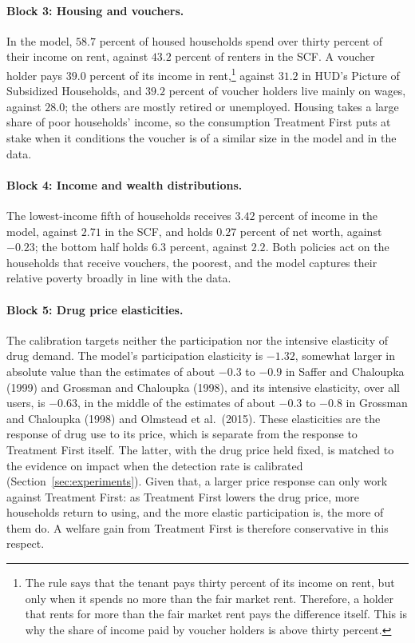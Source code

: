\documentclass[10pt]{article}
\begin{document}
\paragraph{Block 3: Housing and vouchers.} In the model, $58.7$ percent of housed households spend over thirty percent of their income on rent, against $43.2$ percent of renters in the SCF. A voucher holder pays $39.0$ percent of its income in rent,\footnote{ The rule says that the tenant pays thirty percent of its income on rent, but only when it spends no more than the fair market rent. Therefore, a holder that rents for more than the fair market rent pays the difference itself. This is why the share of income paid by voucher holders is above thirty percent.} against $31.2$ in HUD's Picture of Subsidized Households, and $39.2$ percent of voucher holders live mainly on wages, against $28.0$; the others are mostly retired or unemployed. Housing takes a large share of poor households' income, so the consumption Treatment First puts at stake when it conditions the voucher is of a similar size in the model and in the data.

\paragraph{Block 4: Income and wealth distributions.} The lowest-income fifth of households receives $3.42$ percent of income in the model, against $2.71$ in the SCF, and holds $0.27$ percent of net worth, against $-0.23$; the bottom half holds $6.3$ percent, against $2.2$. Both policies act on the households that receive vouchers, the poorest, and the model captures their relative poverty broadly in line with the data.

\paragraph{Block 5: Drug price elasticities.} The calibration targets neither the participation nor the intensive elasticity of drug demand. The model's participation elasticity is $-1.32$, somewhat larger in absolute value than the estimates of about $-0.3$ to $-0.9$ in Saffer and Chaloupka (1999) and Grossman and Chaloupka (1998), and its intensive elasticity, over all users, is $-0.63$, in the middle of the estimates of about $-0.3$ to $-0.8$ in Grossman and Chaloupka (1998) and Olmstead et al.\ (2015). These elasticities are the response of drug use to its price, which is separate from the response to Treatment First itself. The latter, with the drug price held fixed, is matched to the evidence on impact when the detection rate is calibrated (Section~\ref{sec:experiments}). Given that, a larger price response can only work against Treatment First: as Treatment First lowers the drug price, more households return to using, and the more elastic participation is, the more of them do. A welfare gain from Treatment First is therefore conservative in this respect.
\end{document}
